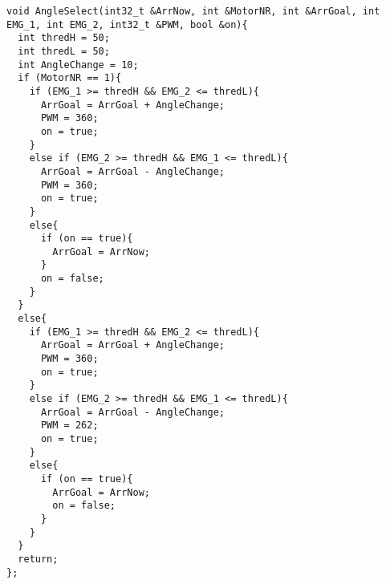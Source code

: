 

\begin{lstlisting}[frame=single,language=Arduino]
void AngleSelect(int32_t &ArrNow, int &MotorNR, int &ArrGoal, int EMG_1, int EMG_2, int32_t &PWM, bool &on){
  int thredH = 50;
  int thredL = 50;
  int AngleChange = 10;
  if (MotorNR == 1){
    if (EMG_1 >= thredH && EMG_2 <= thredL){
      ArrGoal = ArrGoal + AngleChange;
      PWM = 360;
      on = true;
    }
    else if (EMG_2 >= thredH && EMG_1 <= thredL){
      ArrGoal = ArrGoal - AngleChange;
      PWM = 360;
      on = true;
    }
    else{
      if (on == true){
        ArrGoal = ArrNow;
      }
      on = false;
    }
  }
  else{
    if (EMG_1 >= thredH && EMG_2 <= thredL){
      ArrGoal = ArrGoal + AngleChange;
      PWM = 360;
      on = true;
    }
    else if (EMG_2 >= thredH && EMG_1 <= thredL){
      ArrGoal = ArrGoal - AngleChange;
      PWM = 262;
      on = true;
    }
    else{
      if (on == true){
        ArrGoal = ArrNow;
        on = false;
      }
    }
  }
  return;
};
\end{lstlisting} \label{fig:AS}
